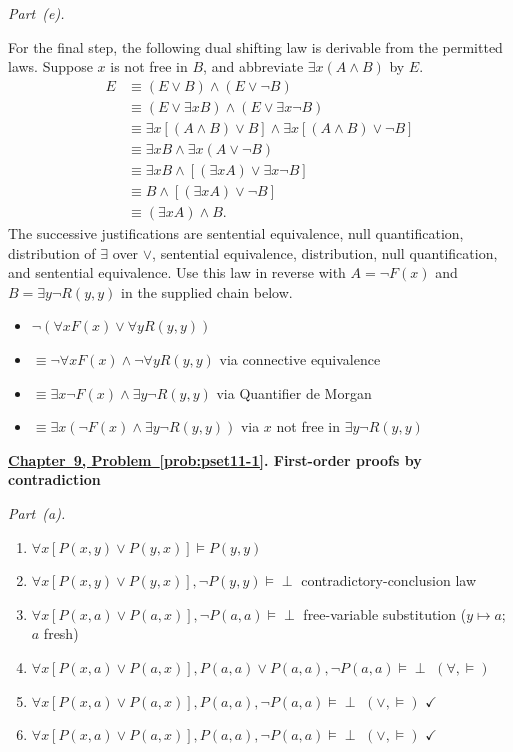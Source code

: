 \documentclass[11pt,letterpaper,oneside,openany]{book}
\newcounter{problem}[chapter]
\newcommand{\problemref}[2]{\hyperref[prob:#2]{Chapter~#1, Problem~\ref*{prob:#2}}}
\newcommand{\solutionheading}[3]{\par\addvspace{12pt}\Needspace{4\baselineskip}\textbf{\problemref{#1}{#2}. #3}\par\nobreak}
\begin{document}
\par\medskip\noindent\textit{Part~(e).}\par\nobreak
For the final step, the following dual shifting law is derivable from the permitted laws. Suppose $x$ is not free in $B$, and abbreviate $\exists x(A\land B)$ by $E$.
\begin{align*}
E &\equiv (E\lor B)\land(E\lor\neg B)\\
&\equiv (E\lor\exists x B)\land(E\lor\exists x\neg B)\\
&\equiv \exists x[(A\land B)\lor B]\land\exists x[(A\land B)\lor\neg B]\\
&\equiv \exists x B\land\exists x(A\lor\neg B)\\
&\equiv \exists x B\land[(\exists x A)\lor\exists x\neg B]\\
&\equiv B\land[(\exists x A)\lor\neg B]\\
&\equiv (\exists x A)\land B.
\end{align*}
The successive justifications are sentential equivalence, null quantification, distribution of $\exists$ over $\lor$, sentential equivalence, distribution, null quantification, and sentential equivalence. Use this law in reverse with $A=\neg F(x)$ and $B=\exists y\neg R(y,y)$ in the supplied chain below.
\begin{itemize}
        \item $\neg ( \forall x F(x) \vee \forall y R(y,y))$
        \item $\equiv \neg \forall x F(x) \wedge \neg \forall y R(y,y)$ via connective equivalence
        \item $\equiv \exists x \neg F(x) \wedge \exists y \neg R(y,y)$ via Quantifier de Morgan
        \item $\equiv \exists x (\neg F(x) \wedge \exists y \neg R(y,y))$ via $x$ not free in $\exists y \neg R(y,y)$
    \end{itemize}

\solutionheading{9}{pset11-1}{First-order proofs by contradiction}
\par\medskip\noindent\textit{Part~(a).}\par\nobreak
\begin{enumerate}[leftmargin=3.5em]
\item[1.] $\forall x [P(x,y) \lor P(y,x)] \vDash P(y,y)$
\item[2.] $\forall x [P(x,y) \lor P(y,x)], \neg P(y,y) \vDash \perp$ \quad contradictory-conclusion law
\item[2a.] $\forall x [P(x,a) \lor P(a,x)], \neg P(a,a) \vDash \perp$ \quad free-variable substitution ($y\mapsto a$; $a$ fresh)
\item[3.] $\forall x [P(x,a) \lor P(a,x)], P(a,a) \lor P(a,a), \neg P(a,a) \vDash \perp$ \quad $(\forall, \vDash)$
\item[4.1.] $\forall x [P(x,a) \lor P(a,x)], P(a,a), \neg P(a,a) \vDash \perp$ \quad $(\lor, \vDash)$ \quad $\checkmark$
\item[4.2.] $\forall x [P(x,a) \lor P(a,x)], P(a,a), \neg P(a,a) \vDash \perp$ \quad $(\lor, \vDash)$ \quad $\checkmark$
\end{enumerate}
\end{document}
